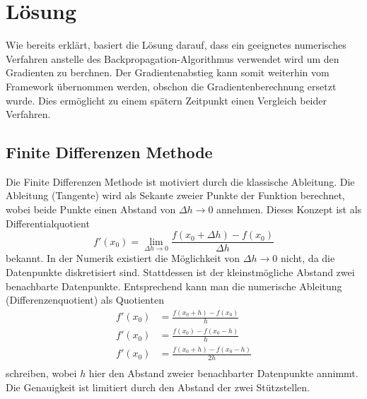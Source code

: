 %
%
%
\section{Lösung
\label{ableitung:section:loesung}}
Wie bereits erklärt, basiert die Lösung darauf, dass ein geeignetes numerisches Verfahren anstelle des Backpropagation-Algorithmus verwendet wird um den Gradienten zu berchnen. Der Gradientenabstieg kann somit weiterhin vom Framework übernommen werden, obschon die Gradientenberechnung ersetzt wurde. Dies ermöglicht zu einem spätern Zeitpunkt einen Vergleich beider Verfahren.
\subsection{Finite Differenzen Methode}
Die Finite Differenzen Methode ist motiviert durch die klassische Ableitung. Die Ableitung (Tangente) wird als Sekante zweier Punkte der Funktion berechnet, wobei beide Punkte einen Abstand von $\Delta h \rightarrow 0$ annehmen.
Dieses Konzept ist als Differentialquotient
\begin{equation}
f'(x_0) = \lim_{{\Delta h} \rightarrow 0} \frac{f(x_0+\Delta h) - f(x_0)}{\Delta h}
\label{ableitung:equations:differentialquotient}
\end{equation}
bekannt. 
In der Numerik existiert die Möglichkeit von $\Delta h \rightarrow 0$ nicht, da die Datenpunkte diskretisiert sind. Stattdessen ist der kleinstmögliche Abstand zwei benachbarte Datenpunkte. Entsprechend kann man die numerische Ableitung (Differenzenquotient) als Quotienten
\begin{equation}
\begin{split}
f'(x_0) &= \frac{f(x_0 + h) - f(x_0)}{h} \\
f'(x_0) &= \frac{f(x_0) - f(x_0 - h)}{h} \\
f'(x_0) &= \frac{f(x_0 + h) - f(x_0 - h)}{2h} \\
\end{split}
\label{ableitung:equations:differenzenquotient}
\end{equation}
schreiben, wobei $h$ hier den Abstand zweier benachbarter Datenpunkte annimmt. Die Genauigkeit ist limitiert durch den Abstand der zwei Stützstellen.
